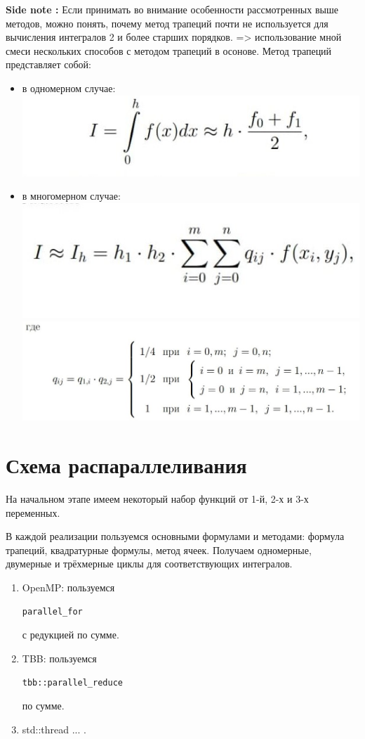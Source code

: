 \documentclass{report}
\begin{document}
\textbf{Side note : }  Если принимать во внимание особенности рассмотренных выше методов, можно понять, почему метод трапеций почти не используется для вычисления интегралов 2 и более старших порядков. => использование мной смеси нескольких способов с методом трапеций в осонове.
Метод трапеций представляет собой:
\begin{itemize}
\item в одномерном случае:\\
\includegraphics[scale=0.8]{bur_img/onedim.jpg}
\item в многомерном случае:\\
\includegraphics[scale=0.8]{bur_img/multidim.jpg}\\
\includegraphics[scale=0.6]{bur_img/system.jpg}
\end{itemize}
\part{Схема распараллеливания}
На начальном этапе имеем некоторый набор функций от 1-й, 2-х и 3-х переменных.

В каждой реализации пользуемся основными формулами и методами: формула трапеций, квадратурные формулы, метод ячеек.
Получаем одномерные, двумерные и трёхмерные циклы для соответствующих интегралов.
\begin{enumerate} 
\item OpenMP: пользуемся \begin{alltt}parallel_for\end{alltt} с редукцией по сумме.
\item TBB: пользуемся \begin{alltt}tbb::parallel_reduce\end{alltt} по сумме.
\item std::thread ... .
\end{enumerate}
\end{document}
